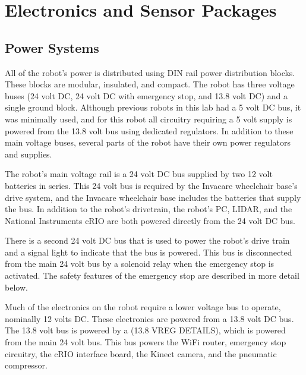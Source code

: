 \documentclass{cwru}
\begin{document}
\section[Electronics and Sensor Packages]{Electronics and Sensor Packages}
\subsection[Power Systems ]{Power Systems }
All of the robot{\textquoteright}s power is distributed using DIN rail power distribution blocks. These blocks are modular, insulated, and compact. The robot has three voltage buses (24 volt DC, 24 volt DC with emergency stop, and 13.8 volt DC) and a single ground block. Although previous robots in this lab had a 5 volt DC bus, it was minimally used, and for this robot all circuitry requiring a 5 volt supply is powered from the 13.8 volt bus using dedicated regulators. In addition to these main voltage buses, several parts of the robot have their own power regulators and supplies.

The robot{\textquoteright}s main voltage rail is a 24 volt DC bus supplied by two 12 volt batteries in series. This 24 volt bus is required by the Invacare wheelchair base{\textquoteright}s drive system, and the Invacare wheelchair base includes the batteries that supply the bus. In addition to the robot{\textquoteright}s drivetrain, the robot{\textquoteright}s PC, LIDAR, and the National Instruments cRIO are both powered directly from the 24 volt DC bus.

There is a second 24 volt DC bus that is used to power the robot{\textquoteright}s drive train and a signal light to indicate that the bus is powered. This bus is disconnected from the main 24 volt bus by a solenoid relay when the emergency stop is activated. The safety features of the emergency stop are described in more detail below.

Much of the electronics on the robot require a lower voltage bus to operate, nominally 12 volts DC. These electronics are powered from a 13.8 volt DC bus. The 13.8 volt bus is powered by a (13.8 VREG DETAILS), which is powered from the main 24 volt bus. This bus powers the WiFi router, emergency stop circuitry, the cRIO interface board, the Kinect camera, and the pneumatic compressor.
\end{document}
